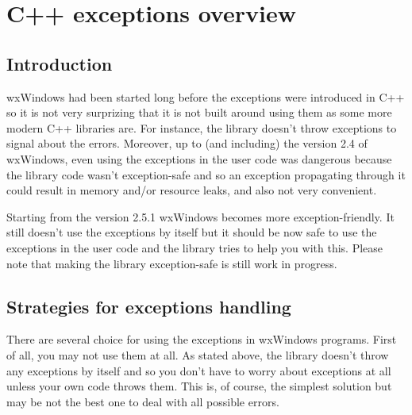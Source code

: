 
\section{C++ exceptions overview}\label{exceptionsoverview}

\subsection{Introduction}

wxWindows had been started long before the exceptions were introduced in C++ so
it is not very surprizing that it is not built around using them as some more
modern C++ libraries are. For instance, the library doesn't throw exceptions to
signal about the errors. Moreover, up to (and including) the version 2.4 of
wxWindows, even using the exceptions in the user code was dangerous because the
library code wasn't exception-safe and so an exception propagating through it
could result in memory and/or resource leaks, and also not very convenient.

Starting from the version 2.5.1 wxWindows becomes more exception-friendly. It
still doesn't use the exceptions by itself but it should be now safe to use the
exceptions in the user code and the library tries to help you with this. Please
note that making the library exception-safe is still work in progress.


\subsection{Strategies for exceptions handling}

There are several choice for using the exceptions in wxWindows programs. First
of all, you may not use them at all. As stated above, the library doesn't throw
any exceptions by itself and so you don't have to worry about exceptions at all
unless your own code throws them. This is, of course, the simplest solution but
may be not the best one to deal with all possible errors.

